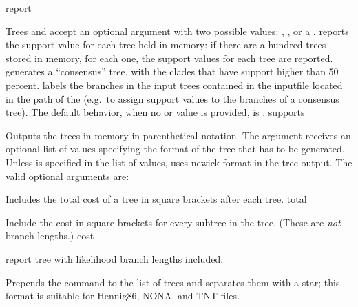 \begin{command}{report}{}
\begin{arguments}
\begin{argumentgroup}{Trees}
{                 and  accept an
                optional argument with two possible values:
                , , or a
                \poystring.
                reports the support value for each tree held in memory: if there
                are a hundred trees stored in memory, for each one, the support
                values for each tree are reported. 
                generates a ``consensus'' tree, with the clades that have
                support higher than 50 percent. \poystring labels the branches
                in the input trees contained in the inputfile located in the path of
                the \poystring (e.g.\ to assign support values to the branches of a consensus
                tree). The default behavior, when no
                 or  value is
                provided, is .}
                {supports}

                {Outputs the trees in memory in parenthetical notation. The argument
                 receives an optional list of values
                specifying the format of the tree that has to be generated.
                Unless  is specified in the list of values, 
                 uses newick format in the tree output. The
                valid optional arguments are:  
                
                \begin{description}
                        {Includes the total cost of a tree in square brackets after each tree.}
                        {total}

                        {Include the cost in square brackets for every subtree in the tree. (These 
                        are \emph{not} branch lengths.)}
                        {cost}

                        {report tree with likelihood branch lengths included.}
                        {}

                        {Prepends the  command to the list of
                        trees and separates them with a star; this format is
                        suitable for Hennig86, NONA, and TNT files.}
                        {}
                        

\end{description}}
\end{argumentgroup}
\end{arguments}
\end{command}
